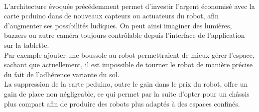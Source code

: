 \documentclass[a4paper]{article}
\begin{document}
\paragraph{}
L’architecture évoquée précédemment permet d’investir l’argent économisé avec la carte pcduino dans de nouveaux capteurs ou actuateurs du robot, afin d’augmenter ses possibilités ludiques. On peut ainsi imaginer des lumières, buzzers ou autre caméra toujours contrôlable depuis l’interface de l’application sur la tablette. \\
Par exemple ajouter une boussole au robot permettraient de mieux gérer l’espace, sachant que actuellement, il est impossible de tourner le robot de manière précise du fait de l’adhérence variante du sol.\\
La suppression de la carte pcduino, outre le gain dans le prix du robot, offre un gain de place non négligeable, ce qui permet par la suite d’opter pour un châssis plus compact afin de produire des robots plus adaptés à des espaces confinés.

\vfill\eject


\end{document}
